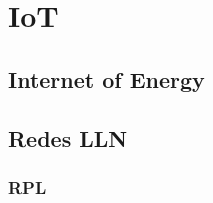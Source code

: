 \section{IoT}
\label{sec:iot}








\subsection{Internet of Energy}
\cite{ioe}



\subsection{Redes LLN}


\subsubsection{RPL}
